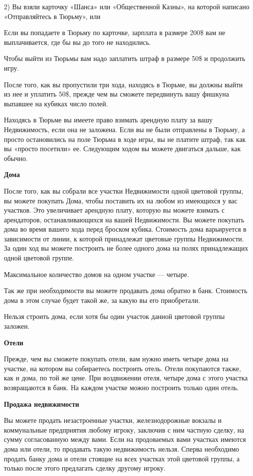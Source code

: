 2) Вы взяли карточку «Шанса» или «Общественной Казны», на которой написано «Отправляйтесь в Тюрьму», или

Если вы попадаете в Тюрьму по карточке, зарплата в размере 200\$ вам не выплачивается, где бы вы до того не находились.

Чтобы выйти из Тюрьмы вам надо заплатить штраф в размере 50\$ и продолжить игру.

После того, как вы пропустили три хода, находясь в Тюрьме, вы должны выйти из нее и уплатить 50\$, прежде чем вы сможете передвинуть вашу фишкуна выпавшее на кубиках число полей.

Находясь в Тюрьме вы имеете право взимать арендную плату за вашу Недвижимость, если она не заложена. Если вы не были отправлены в Тюрьму, а просто остановились на поле Тюрьма в ходе игры, вы не платите штраф, так как вы «просто посетили» ее. Следующим ходом вы можете двигаться дальше, как обычно.

{\bf Дома}

После того, как вы собрали все участки Недвижимости одной цветовой группы, вы можете покупать Дома, чтобы поставить их на любом из имеющихся у вас участков. Это увеличивает арендную плату, которую вы можете взимать с арендаторов, останавливающихся на вашей Недвижимости. Вы можете покупать дома во время вашего хода перед броском кубика. Стоимость дома варьируется в зависимости от линии, к которой принадлежат цветовые группы Недвижимости. За один ход вы можете построить не более одного дома на полях принадлежащих одной цветовой группе.

Максимальное количество домов на одном участке — четыре.

Так же при необходимости вы можете продавать дома обратно в банк. Стоимость дома в этом случае будет такой же, за какую вы его приобретали.

Нельзя строить дома, если хотя бы один участок данной цветовой группы заложен.

{\bf Отели}

Прежде, чем вы сможете покупать отели, вам нужно иметь четыре дома на участке, на котором вы собираетесь построить отель. Отели покупаются также, как и дома, по той же цене. При воздвижении отеля, четыре дома с этого участка возвращаются в банк. На каждом участке можно построить только один отель.

{\bf Продажа недвижимости}

Вы можете продать незастроенные участки, железнодорожные вокзалы и коммунальные предприятия любому игроку, заключив с ним частную сделку, на сумму согласованную между вами. Если на продоваемых вами участках имеются дома или отели, то продавать такую недвижимость нельзя. Сперва необходимо продать банку дома и отели стоящие на всех участках этой цветовой группы, а только после этого предлагать сделку другому игроку.

